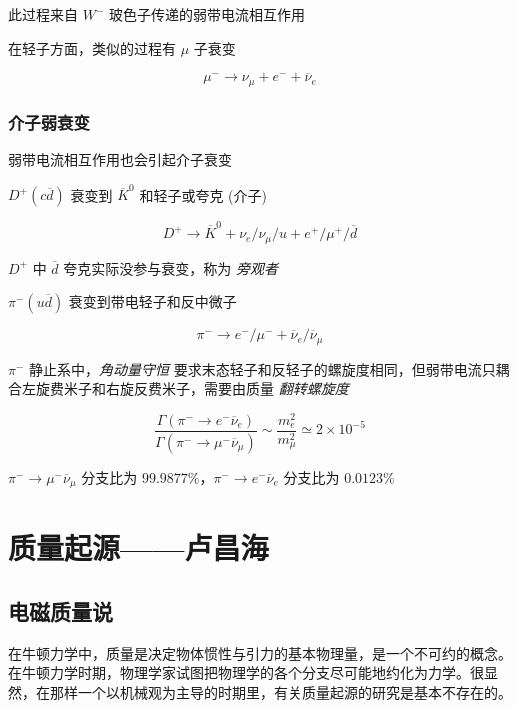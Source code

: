 \documentclass[oneside,a4paper,openany,11pt]{ctexbook}
\begin{document}
此过程来自 $W^-$ 玻色子传递的弱带电流相互作用

在轻子方面，类似的过程有 $\mu$ 子衰变

\begin{equation}
    \mu^- \to \nu_\mu + e^- + \overline{\nu}_e
\end{equation}

\subsection{介子弱衰变}

弱带电流相互作用也会引起介子衰变

$D^+(c\overline{d})$ 衰变到 $\overline{K}^0$ 和轻子或夸克 (介子)

\begin{equation}
    D^+ \to \overline{K}^0 + \nu_e / \nu_\mu / u + e^+ / \mu^+ / \overline{d}
\end{equation}

$D^+$ 中 $\overline{d}$ 夸克实际没参与衰变，称为 \emph{旁观者}

$\pi^-(u\overline{d})$ 衰变到带电轻子和反中微子

\begin{equation}
    \pi^- \to e^- / \mu^- + \overline{\nu}_e / \overline{\nu}_\mu
\end{equation}

$\pi^-$ 静止系中，\emph{角动量守恒} 要求末态轻子和反轻子的螺旋度相同，但弱带电流只耦合左旋费米子和右旋反费米子，需要由质量 \emph{翻转螺旋度}

\begin{equation}
    \frac{\Gamma(\pi^- \to e^- \overline{\nu}_e)}{\Gamma(\pi^- \to \mu^- \overline{\nu}_\mu)} \sim \frac{m_e^2}{m_\mu^2} \simeq 2 \times 10^{-5}
\end{equation}

$\pi^- \to \mu^- \overline{\nu}_\mu$ 分支比为 $99.9877\%$，$\pi^- \to e^- \overline{\nu}_e$ 分支比为 $0.0123\%$

\chapter{质量起源——卢昌海}

\section{电磁质量说}

在牛顿力学中，质量是决定物体惯性与引力的基本物理量，是一个不可约的概念。在牛顿力学时期，物理学家试图把物理学的各个分支尽可能地约化为力学。很显然，在那样一个以机械观为主导的时期里，有关质量起源的研究是基本不存在的。
\end{document}
